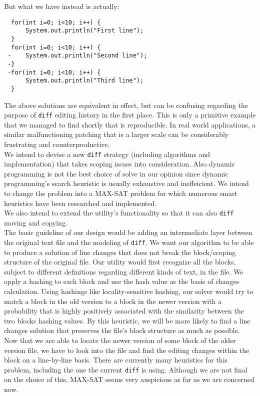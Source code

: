 \documentclass{article}
\begin{document}
\pagebreak
But what we have instead is actually:
\begin{lstlisting}
  for(int i=0; i<10; i++) {
      System.out.println("First line");
  }
  for(int i=0; i<10; i++) {
 -    System.out.println("Second line");
 -}
 -for(int i=0; i<10; i++) {
      System.out.println("Third line");
  }
\end{lstlisting}

The above solutions are equivalent in effect, but can be confusing regarding the purpose of \texttt{diff} editing history in the first place. This is only a primitive example that we managed to find shortly that is reproducible. In real world applications, a similar malfunctioning patching that is a larger scale can be considerably frustrating and counterproductive.\\

We intend to devise a new \texttt{diff} strategy (including algorithms and implementation) that takes scoping issues into consideration. Also dynamic programming is not the best choice of solve in our opinion since dynamic programming's search heuristic is usually exhaustive and ineffeicient. We intend to change the problem into a MAX-SAT problem for which numerous smart heuristics have been researched and implemented.\\

We also intend to extend the utility's functionality so that it can also \texttt{diff} moving and copying.\\

The basic guideline of our design would be adding an intermediate layer between the original text file and the modeling of \texttt{diff}. We want our algorithm to be able to produce a solution of line changes that does not break the block/scoping structure of the original file. Our utility would first recognize all the blocks, subject to different definitions regarding different kinds of text, in the file. We apply a hashing to each block and use the hash value as the basis of changes calculation. Using hashings like locality-sensitive hashing, our solver would try to match a block in the old version to a block in the newer version with a probability that is highly positively associated with the similarity between the two blocks hashing values. By this heuristic, we will be more likely to find a line changes solution that preserves the file's block structure as much as possible.\\

Now that we are able to locate the newer version of some block of the older version file, we have to look into the file and find the editing changes within the block on a line-by-line basis. There are currently many heuristics for this problem, including the one the current \texttt{diff} is using. Although we are not final on the choice of this, MAX-SAT seems very auspicious as far as we are concerned now.
\end{document}
